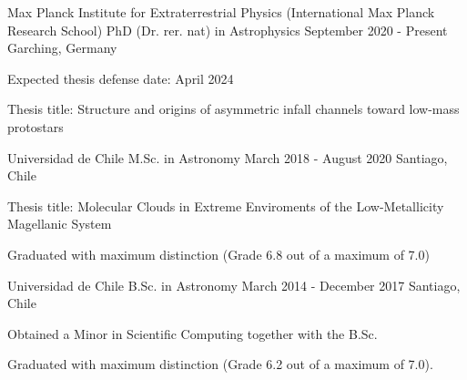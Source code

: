 

\begin{cventries}

 \cventry
    {Max Planck Institute for Extraterrestrial Physics (International Max Planck Research School)} %
    {PhD (Dr. rer. nat) in Astrophysics} %
    {September 2020 - Present} %
    {Garching, Germany} %
    { \begin{cvitems} %
      \item{Expected thesis defense date: April 2024}
      \item{Thesis title: Structure and origins of asymmetric infall channels toward low-mass protostars}
      \end{cvitems}
      }


 \cventry
    {Universidad de Chile} %
    {M.Sc. in Astronomy} %
    {March 2018 - August 2020} %
    {Santiago, Chile} %
    {\begin{cvitems} %
    		\item {Thesis title: Molecular Clouds in Extreme Enviroments of the Low-Metallicity Magellanic System}
    		\item {Graduated with maximum distinction (Grade 6.8 out of a maximum of 7.0)}
    	\end{cvitems} }
    

  \cventry
    {Universidad de Chile} %
    {B.Sc. in Astronomy} %
    {March 2014 - December 2017} %
     {Santiago, Chile} %
    {
      \begin{cvitems} %
      \item{Obtained a Minor in Scientific Computing together with the B.Sc.}
       \item {Graduated with maximum distinction (Grade 6.2 out of a maximum of 7.0).}
      \end{cvitems}
    }

\end{cventries}

